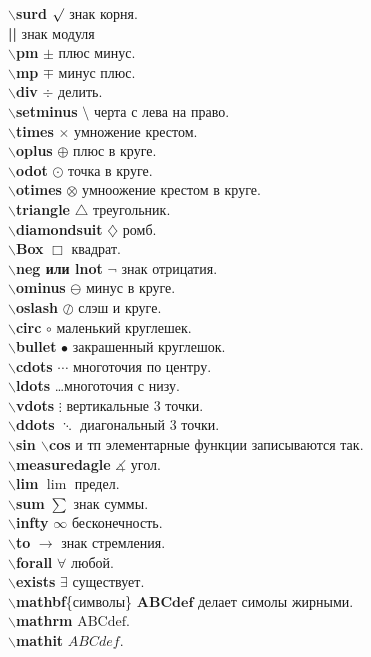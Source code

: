 \documentclass{article}
\newcommand{\bb}[1]{{\bfseries $\backslash$#1}} %
\begin{document}
\bb{surd} $\surd$ знак корня.\\
{\bfseries ||} знак модуля\\
\bb{pm} $\pm$ плюс минус.\\
\bb{mp} $\mp$ минус плюс.\\
\bb{div} $\div$ делить.\\
\bb{setminus} $\setminus$ черта с лева на право.\\
\bb{times} $\times$ умножение крестом.\\
\bb{oplus} $\oplus$ плюс в круге.\\
\bb{odot} $\odot$ точка в круге.\\
\bb{otimes} $\otimes$ умноожение крестом в круге.\\
\bb{triangle} $\triangle$ треугольник.\\
\bb{diamondsuit} $\diamondsuit$ ромб.\\
\bb{Box} $\Box$ квадрат.\\
\bb{neg или lnot} $\lnot$ знак отрицатия.\\
\bb{ominus} $\ominus$ минус в круге.\\
\bb{oslash} $\oslash$ слэш и круге.\\
\bb{circ} $\circ$ маленький круглешек.\\
\bb{bullet} $\bullet$ закрашенный круглешок.\\
\bb{cdots} $\cdots$ многоточия по центру.\\ 
\bb{ldots} \ldots многоточия с низу.\\
\bb{vdots} $\vdots$ вертикальные 3 точки.\\
\bb{ddots} $\ddots$ диагональный 3 точки.\\ 
\bb{sin   $\backslash$cos} и тп элементарные функции записываются так.\\
\bb{measuredagle} $\measuredangle$ угол.\\
\bb{lim} $\lim$ предел.\\
\bb{sum} $\sum$ знак суммы.\\
\bb{infty} $\infty$ бесконечность.\\
\bb{to} $\to$ знак стремления.\\
\bb{forall} $\forall$ любой.\\
\bb{exists} $\exists$ существует.\\
\bb{mathbf}\{символы\} $\mathbf{ABCdef}$ делает симолы жирными.\\
\bb{mathrm} $\mathrm{ABCdef}$.\\
\bb{mathit} $\mathit{ABCdef}$.\\
\end{document}

